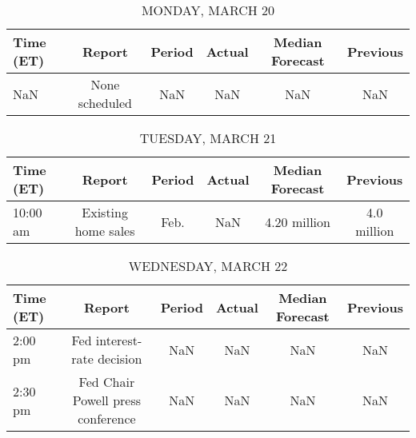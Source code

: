 \documentclass{article}%
\begin{document}
%
\normalsize%


\begin{table}[htbp]%
\caption{MONDAY, MARCH 20}%
\centering%
\begin{adjustbox}{width=1\textwidth}%
\begin{tabular}{lccccc}
\toprule
Time (ET) &         Report & Period & Actual & Median Forecast & Previous \\
\midrule
      NaN & None scheduled &    NaN &    NaN &             NaN &      NaN \\
\bottomrule
\end{tabular}
%
\end{adjustbox}%
\end{table}

%


\begin{table}[htbp]%
\caption{TUESDAY, MARCH 21}%
\centering%
\begin{adjustbox}{width=1\textwidth}%
\begin{tabular}{lccccc}
\toprule
Time (ET) &              Report & Period & Actual & Median Forecast &    Previous \\
\midrule
 10:00 am & Existing home sales &   Feb. &    NaN &    4.20 million & 4.0 million \\
\bottomrule
\end{tabular}
%
\end{adjustbox}%
\end{table}

%


\begin{table}[htbp]%
\caption{WEDNESDAY, MARCH 22}%
\centering%
\begin{adjustbox}{width=1\textwidth}%
\begin{tabular}{lccccc}
\toprule
Time (ET) &                            Report & Period & Actual & Median Forecast & Previous \\
\midrule
  2:00 pm &        Fed interest-rate decision &    NaN &    NaN &             NaN &      NaN \\
  2:30 pm & Fed Chair Powell press conference &    NaN &    NaN &             NaN &      NaN \\
\bottomrule
\end{tabular}
%
\end{adjustbox}%
\end{table}

%
\end{document}
